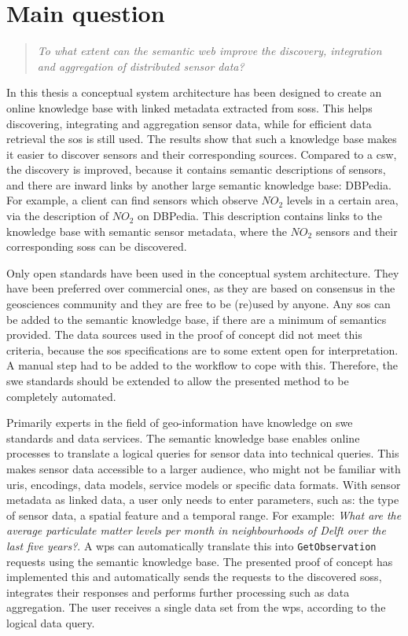 \section{Main question}
\label{mainQuestion}
\begin{quote}
	\textit{To what extent can the semantic web improve the discovery, integration and aggregation of distributed sensor data?}%
\end{quote}

In this thesis a conceptual system architecture has been designed to create an online knowledge base with linked metadata extracted from \aclp{sos}. This helps discovering, integrating and aggregation sensor data, while for efficient data retrieval the \ac{sos} is still used. The results show that such a knowledge base makes it easier to discover sensors and their corresponding sources. Compared to a \ac{csw}, the discovery is improved, because it contains semantic descriptions of sensors, and there are inward links by another large semantic knowledge base: DBPedia. For example, a client can find sensors which observe $NO_{2}$ levels in a certain area, via the description of $NO_{2}$ on DBPedia. This description contains links to the knowledge base with semantic sensor metadata, where the $NO_{2}$ sensors and their corresponding \aclp{sos} can be discovered.

Only open standards have been used in the conceptual system architecture. They have been preferred over commercial ones, as they are based on consensus in the geosciences community and they are free to be (re)used by anyone. Any \ac{sos} can be added to the semantic knowledge base, if there are a minimum of semantics provided. The data sources used in the proof of concept did not meet this criteria, because the \ac{sos} specifications are to some extent open for interpretation. A manual step had to be added to the workflow to cope with this. Therefore, the \ac{swe} standards should be extended to allow the presented method to be completely automated. 

Primarily experts in the field of geo-information have knowledge on \ac{swe} standards and data services. The semantic knowledge base enables online processes to translate a logical queries for sensor data into technical queries. This makes sensor data accessible to a larger audience, who might not be familiar with \acp{uri}, encodings, data models, service models or specific data formats. With sensor metadata as linked data, a user only needs to enter parameters, such as: the type of sensor data, a spatial feature and a temporal range. For example: \textit{What are the average particulate matter levels per month in neighbourhoods of Delft over the last five years?}. A \ac{wps} can automatically translate this into \texttt{GetObservation} requests using the semantic knowledge base. The presented proof of concept has implemented this and automatically sends the requests to the discovered \aclp{sos}, integrates their responses and performs further processing such as data aggregation. The user receives a single data set from the \ac{wps}, according to the logical data query.   


